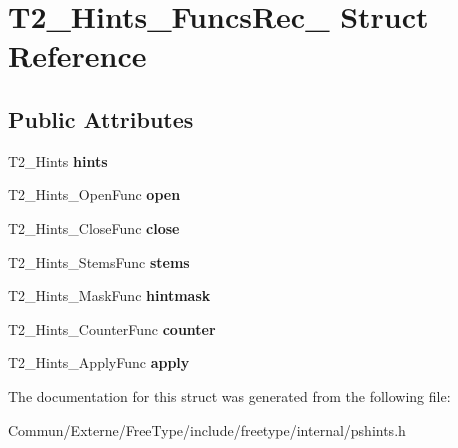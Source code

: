 \hypertarget{struct_t2___hints___funcs_rec__}{}\section{T2\+\_\+\+Hints\+\_\+\+Funcs\+Rec\+\_\+ Struct Reference}
\label{struct_t2___hints___funcs_rec__}
\subsection*{Public Attributes}
\begin{DoxyCompactItemize}
\item 
T2\+\_\+\+Hints {\bfseries hints}\hypertarget{struct_t2___hints___funcs_rec___af8daab694889bede5a513fbae5f86e25}{}\label{struct_t2___hints___funcs_rec___af8daab694889bede5a513fbae5f86e25}

\item 
T2\+\_\+\+Hints\+\_\+\+Open\+Func {\bfseries open}\hypertarget{struct_t2___hints___funcs_rec___a1a5e0b296ee2e2ae6711b3ee35e5fcd9}{}\label{struct_t2___hints___funcs_rec___a1a5e0b296ee2e2ae6711b3ee35e5fcd9}

\item 
T2\+\_\+\+Hints\+\_\+\+Close\+Func {\bfseries close}\hypertarget{struct_t2___hints___funcs_rec___a7e50e26fd55254044bc9f2ba62574352}{}\label{struct_t2___hints___funcs_rec___a7e50e26fd55254044bc9f2ba62574352}

\item 
T2\+\_\+\+Hints\+\_\+\+Stems\+Func {\bfseries stems}\hypertarget{struct_t2___hints___funcs_rec___a12bfd8bae5d3df8f570fcdfb70c00139}{}\label{struct_t2___hints___funcs_rec___a12bfd8bae5d3df8f570fcdfb70c00139}

\item 
T2\+\_\+\+Hints\+\_\+\+Mask\+Func {\bfseries hintmask}\hypertarget{struct_t2___hints___funcs_rec___af50d0cadda7033d7dbd27a199ccfcdd4}{}\label{struct_t2___hints___funcs_rec___af50d0cadda7033d7dbd27a199ccfcdd4}

\item 
T2\+\_\+\+Hints\+\_\+\+Counter\+Func {\bfseries counter}\hypertarget{struct_t2___hints___funcs_rec___ad9d856a64b4a8556fc8d74bae1779e11}{}\label{struct_t2___hints___funcs_rec___ad9d856a64b4a8556fc8d74bae1779e11}

\item 
T2\+\_\+\+Hints\+\_\+\+Apply\+Func {\bfseries apply}\hypertarget{struct_t2___hints___funcs_rec___abaf12efb416bd79cf4ce72b13e6fc68f}{}\label{struct_t2___hints___funcs_rec___abaf12efb416bd79cf4ce72b13e6fc68f}

\end{DoxyCompactItemize}


The documentation for this struct was generated from the following file\+:\begin{DoxyCompactItemize}
\item 
Commun/\+Externe/\+Free\+Type/include/freetype/internal/pshints.\+h\end{DoxyCompactItemize}
